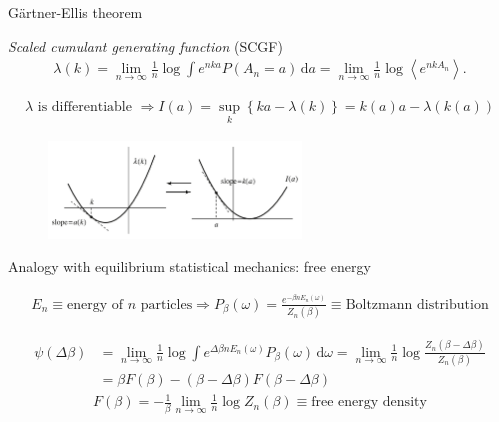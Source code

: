 \documentclass{beamer}
\begin{document}
\begin{frame}{Gärtner-Ellis theorem}

\textit{Scaled cumulant generating function} (SCGF)
\begin{align*}
\lambda(k) = \lim_{n \rightarrow \infty} \frac{1}{n} \log \int e^{n k a} P(A_n = a) \, \text{d}a = \lim_{n \rightarrow \infty} \frac{1}{n} \log \left<e^{n k A_n}\right>.
\end{align*}

\return
\begin{align*}
\lambda \text{ is differentiable } \Rightarrow I(a) = \sup_k \left\{k a - \lambda(k)\right\} = k(a) a - \lambda(k(a)) %
\end{align*}

\begin{figure}
\centering
\includegraphics[width=0.6\textwidth]{Touchette_2009_fig4b.png}
\caption{}
\end{figure}

\end{frame}

\begin{frame}{Analogy with equilibrium statistical mechanics: free energy}

\begin{align*}
E_n \equiv\text{energy of $n$ particles} \Rightarrow P_{\beta}(\omega) = \frac{e^{- \beta n E_n(\omega)}}{Z_n(\beta)} \equiv \text{Boltzmann distribution}
\end{align*}

\return
\begin{align*}
\psi(\Delta\beta) &= \lim_{n \rightarrow \infty} \frac{1}{n} \log \int e^{\Delta\beta n E_n(\omega)} P_{\beta}(\omega) \, \text{d}\omega = \lim_{n \rightarrow \infty} \frac{1}{n} \log \frac{Z_n(\beta - \Delta\beta)}{Z_n(\beta)}\\
&= \beta F(\beta) - (\beta - \Delta\beta) F(\beta - \Delta\beta)
\end{align*}
\begin{align*}
F(\beta) = -\frac{1}{\beta} \lim_{n \rightarrow \infty} \frac{1}{n} \log Z_n(\beta) \equiv \text{free energy density}
\end{align*}

\end{frame}
\end{document}
